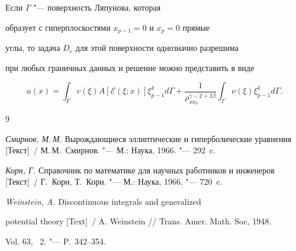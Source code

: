 \begin{theorem}[11] Если $\Gamma $ "--- поверхность Ляпунова, которая


образует с гиперплоскостями $x_{p - 1} = 0$ и $x_p = 0$ прямые


углы,  то задача $D_e $ для этой поверхности однозначно разрешима


при любых граничных данных и решение можно представить в виде


\[


u\left( x \right) = \int_\Gamma {v\left( \xi \right)}


A\left[ \mathcal{E}\left(\xi; x\right)\right]\xi _{p - 1}^k d\Gamma


+ \frac{1}{\rho _{xx_0 }^{\gamma - 2 + 2\beta }


}\int_\Gamma {\nu \left( \xi \right)\xi _{p - 1}^k d\Gamma


}.


\]


\end{theorem}





\begin{thebibliography}{9}







\emph{Смирнов,  М.\,М.} Вырождающиеся эллиптические и гиперболические уравнения [Текст]~/ М.\,М.~Смирнов. "--- М.: Наука,  1966. "--- 292~c.







\emph{Корн,  Г.} Справочник по математике для научных работников и инженеров [Текст]~/ Г.~Корн,  Т.~Корн.  "--- М.: Наука,  1966. "--- 720~c.







\emph{Weinstein,  A. }  Discontinuous integrals and generalized


potential theory [Text]~/ A. Weinstein /\!/ Trans. Amer. Math. Soc,  1948.


Vol. 63, \No~2. "--- P.~342--354.


\end{thebibliography}





\makeengtitle










%


